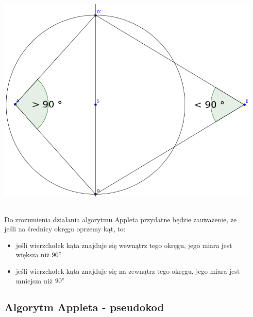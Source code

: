 \documentclass[hidelinks]{article}
\begin{document}
\includegraphics[width=\textwidth]{pics/angles.png}

~ \\

Do zrozumienia działania algorytmu Appleta przydatne będzie zauważenie, że jeśli na średnicy okręgu oprzemy kąt, to:

\begin{itemize}

\item jeśli wierzchołek kąta znajduje się wewnątrz tego okręgu, jego miara jest większa niż $90 \degree $

\item jeśli wierzchołek kąta znajduje się na zewnątrz tego okręgu, jego miara jest mniejsza niż $90 \degree $

\end{itemize}

\newpage

\subsection{Algorytm Appleta - pseudokod}
\end{document}
